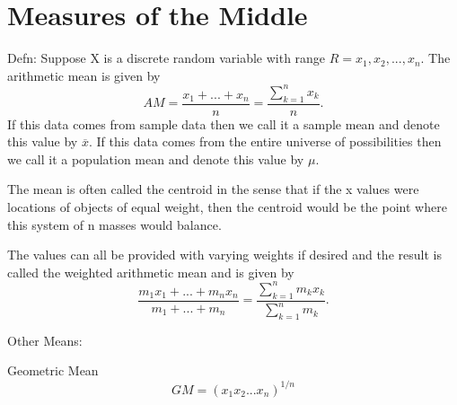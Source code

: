 \documentclass[10pt,]{book}
\theoremstyle{plain}
\theoremstyle{definition}
\theoremstyle{definition}
\numberwithin{equation}{section}
\begin{document}
\section[Measures of the Middle]{Measures of the Middle}\label{section-7}

Defn: Suppose X is a discrete random variable with range \(R = {x_1, x_2, ..., x_n}\). The arithmetic mean is given by
\begin{equation*}
AM = \frac{x_1 + ... + x_n}{n} = \frac{\sum_{k=1}^n x_k}{n}.
\end{equation*}
If this data comes from sample data then we call it a sample mean and denote this value by \(\overline{x}\). If this data comes from the entire universe of possibilities then we call it a population mean and denote this value by \(\mu\).%
\par

The mean is often called the centroid in the sense that if the x values were locations of objects of equal weight, then the centroid
would be the point where this system of n masses would balance. 
%
\par

The values can all be provided with varying weights if desired and the result is called the weighted arithmetic mean and is given by
\begin{equation*}
\frac{m_1 x_1 + ... + m_n x_n}{m_1 + ... + m_n} = \frac{\sum_{k=1}^n m_k x_k}{\sum_{k=1}^n m_k}.
\end{equation*}
%
\par

Other Means:
%
\par

Geometric Mean
\begin{equation*}GM = (x_1 x_2 ... x_n)^{1/n}\end{equation*}
%
\par
\end{document}
